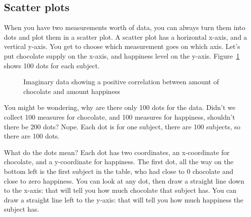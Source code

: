 \documentclass[
  letterpaper,
  DIV=11,
  numbers=noendperiod]{scrreprt}
\begin{document}
\subsection{Scatter plots}\label{scatter-plots}

When you have two measurements worth of data, you can always turn them
into dots and plot them in a scatter plot. A scatter plot has a
horizontal x-axis, and a vertical y-axis. You get to choose which
measurement goes on which axis. Let's put chocolate supply on the
x-axis, and happiness level on the y-axis. Figure~\ref{fig-3scatter1}
shows 100 dots for each subject.

\begin{figure}


\caption{\label{fig-3scatter1}Imaginary data showing a positive
correlation between amount of chocolate and amount happiness}

\end{figure}%

You might be wondering, why are there only 100 dots for the data. Didn't
we collect 100 measures for chocolate, and 100 measures for happiness,
shouldn't there be 200 dots? Nope. Each dot is for one subject, there
are 100 subjects, so there are 100 dots.

What do the dots mean? Each dot has two coordinates, an x-coordinate for
chocolate, and a y-coordinate for happiness. The first dot, all the way
on the bottom left is the first subject in the table, who had close to 0
chocolate and close to zero happiness. You can look at any dot, then
draw a straight line down to the x-axis: that will tell you how much
chocolate that subject has. You can draw a straight line left to the
y-axis: that will tell you how much happiness the subject has.
\end{document}
